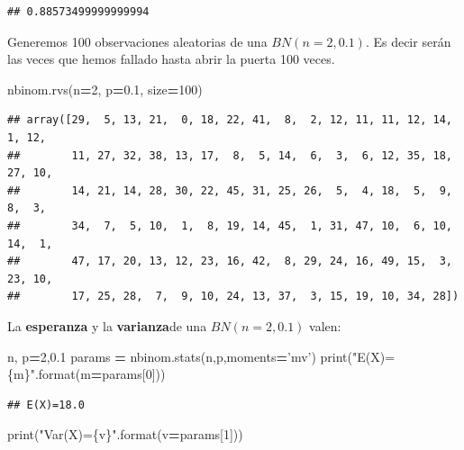\documentclass[]{book}
\newenvironment{Shaded}{\begin{snugshade}}{\end{snugshade}}
\newcommand{\BuiltInTok}[1]{#1}
\newcommand{\DecValTok}[1]{\textcolor[rgb]{0.00,0.00,0.81}{#1}}
\newcommand{\FloatTok}[1]{\textcolor[rgb]{0.00,0.00,0.81}{#1}}
\newcommand{\NormalTok}[1]{#1}
\newcommand{\OperatorTok}[1]{\textcolor[rgb]{0.81,0.36,0.00}{\textbf{#1}}}
\newcommand{\SpecialCharTok}[1]{\textcolor[rgb]{0.00,0.00,0.00}{#1}}
\newcommand{\StringTok}[1]{\textcolor[rgb]{0.31,0.60,0.02}{#1}}
\begin{document}
\begin{verbatim}
## 0.88573499999999994
\end{verbatim}

Generemos 100 observaciones aleatorias de una \(BN(n=2,0.1)\). Es decir serán las veces que hemos fallado hasta abrir la puerta 100 veces.

\begin{Shaded}
\begin{Highlighting}[]
\NormalTok{nbinom.rvs(n}\OperatorTok{=}\DecValTok{2}\NormalTok{, p}\OperatorTok{=}\FloatTok{0.1}\NormalTok{, size}\OperatorTok{=}\DecValTok{100}\NormalTok{)}
\end{Highlighting}
\end{Shaded}

\begin{verbatim}
## array([29,  5, 13, 21,  0, 18, 22, 41,  8,  2, 12, 11, 11, 12, 14,  1, 12,
##        11, 27, 32, 38, 13, 17,  8,  5, 14,  6,  3,  6, 12, 35, 18, 27, 10,
##        14, 21, 14, 28, 30, 22, 45, 31, 25, 26,  5,  4, 18,  5,  9,  8,  3,
##        34,  7,  5, 10,  1,  8, 19, 14, 45,  1, 31, 47, 10,  6, 10, 14,  1,
##        47, 17, 20, 13, 12, 23, 16, 42,  8, 29, 24, 16, 49, 15,  3, 23, 10,
##        17, 25, 28,  7,  9, 10, 24, 13, 37,  3, 15, 19, 10, 34, 28])
\end{verbatim}

La \textbf{esperanza} y la \textbf{varianza}de una \(BN(n=2,0.1)\) valen:

\begin{Shaded}
\begin{Highlighting}[]
\NormalTok{n, p}\OperatorTok{=}\DecValTok{2}\NormalTok{,}\FloatTok{0.1}
\NormalTok{params }\OperatorTok{=}\NormalTok{ nbinom.stats(n,p,moments}\OperatorTok{=}\StringTok{'mv'}\NormalTok{)}
\BuiltInTok{print}\NormalTok{(}\StringTok{"E(X)=}\SpecialCharTok{\{m\}}\StringTok{"}\NormalTok{.}\BuiltInTok{format}\NormalTok{(m}\OperatorTok{=}\NormalTok{params[}\DecValTok{0}\NormalTok{]))}
\end{Highlighting}
\end{Shaded}

\begin{verbatim}
## E(X)=18.0
\end{verbatim}

\begin{Shaded}
\begin{Highlighting}[]
\BuiltInTok{print}\NormalTok{(}\StringTok{"Var(X)=}\SpecialCharTok{\{v\}}\StringTok{"}\NormalTok{.}\BuiltInTok{format}\NormalTok{(v}\OperatorTok{=}\NormalTok{params[}\DecValTok{1}\NormalTok{]))}
\end{Highlighting}
\end{Shaded}
\end{document}
